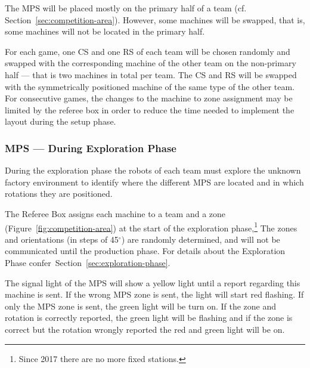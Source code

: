 \documentclass[12pt,twoside]{article}
\newcommand{\refsec}[1]{Section~\ref{#1}}
\newcommand{\reffig}[1]{Figure~\ref{#1}}
\begin{document}
The MPS will be placed mostly on the primary half of a team
(cf. \refsec{sec:competition-area}). However, some machines will be
swapped, that is, some machines will not be located in the primary
half.

For each game, one CS and one RS of each team will be chosen randomly
and swapped with the corresponding machine of the other team on the
non-primary half --- that is two machines in total per team. The CS and
RS will be swapped with the symmetrically positioned machine of the
same type of the other team. For consecutive games, the changes to the
machine to zone assignment may be limited by the referee box in order
to reduce the time needed to implement the layout during the setup
phase.

\subsubsection{MPS --- During Exploration Phase}
\label{sec:production-machines-exp}
During the exploration phase the robots of each team must explore the
unknown factory environment to identify where the different MPS are
located and in which rotations they are positioned.

The Referee Box assigns each machine to a team and a zone
(\reffig{fig:competition-area}) at the start of the exploration
phase,\footnote{Since 2017 there are no more fixed stations.}
The zones and orientations (in steps of 45$^\circ$) are randomly determined,
and will not be communicated until the production phase. For details about the
Exploration Phase confer~\refsec{sec:exploration-phase}.

The signal light of the MPS will show a yellow light until a report regarding
this machine is sent.  If the wrong MPS zone is sent, the light will start red
flashing.  If only the MPS zone is sent, the green light will be turn on.  If
the zone and rotation is correctly reported, the green light will be flashing
and if the zone is correct but the rotation wrongly reported the red and green
light will be on.
\end{document}
